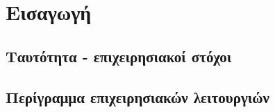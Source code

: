 \section{Εισαγωγή}

\subsection{Ταυτότητα - επιχειρησιακοί στόχοι}


\subsection{Περίγραμμα επιχειρησιακών λειτουργιών}